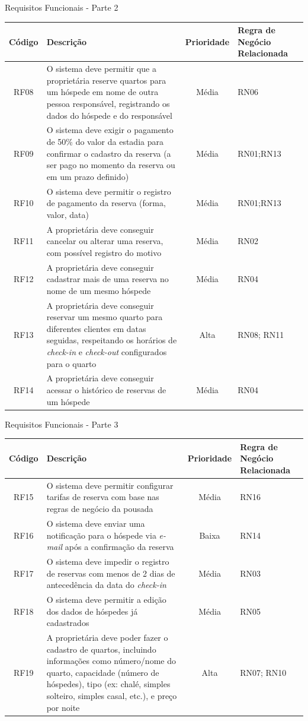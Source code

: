 \documentclass[
	12pt,				%
	openany,			%
	twoside,			%
	a4paper,			%
	english,			%
	french,				%
	spanish,			%
	brazil				%
	]{abntex2}
\begin{document}
\begin{quadro}[H]
	\caption{Requisitos Funcionais - Parte 2}
	\label{quadro_rf2}
	\begin{tabular}{|c|p{5cm}|c|p{4cm}|}
		\hline
		\textbf{Código} & \textbf{Descrição} & \textbf{Prioridade} & \textbf{Regra de Negócio Relacionada} \\ \hline
		RF08 & O sistema deve permitir que a proprietária reserve quartos para um hóspede em nome de outra pessoa responsável, registrando os dados do hóspede e do responsável & Média & RN06 \\ \hline
		RF09 & O sistema deve exigir o pagamento de 50\% do valor da estadia para confirmar o cadastro da reserva (a ser pago no momento da reserva ou em um prazo definido) & Média & RN01;RN13 \\ \hline
		RF10 & O sistema deve permitir o registro de pagamento da reserva (forma, valor, data) & Média & RN01;RN13 \\ \hline
		RF11 & A proprietária deve conseguir cancelar ou alterar uma reserva, com possível registro do motivo & Média & RN02 \\ \hline
		RF12 & A proprietária deve conseguir cadastrar mais de uma reserva no nome de um mesmo hóspede & Média & RN04 \\ \hline
		RF13 & A proprietária deve conseguir reservar um mesmo quarto para diferentes clientes em datas seguidas, respeitando os horários de \textit{check-in} e \textit{check-out} configurados para o quarto & Alta & RN08; RN11\\ \hline
		RF14 & A proprietária deve conseguir acessar o histórico de reservas de um hóspede & Média & RN04 \\ \hline
	\end{tabular}
\end{quadro}
\begin{quadro}[H]
	\caption{Requisitos Funcionais - Parte 3}
	\label{quadro_rf3}
	\begin{tabular}{|c|p{5cm}|c|p{4cm}|}
		\hline
		\textbf{Código} & \textbf{Descrição} & \textbf{Prioridade} & \textbf{Regra de Negócio Relacionada} \\ \hline
		RF15 & O sistema deve permitir configurar tarifas de reserva com base nas regras de negócio da pousada & Média & RN16 \\ \hline
		RF16 & O sistema deve enviar uma notificação para o hóspede via \textit{e-mail} após a confirmação da reserva & Baixa & RN14 \\ \hline
		RF17 & O sistema deve impedir o registro de reservas com menos de 2 dias de antecedência da data do \textit{check-in} & Média & RN03 \\ \hline
		RF18 & O sistema deve permitir  a edição dos dados de hóspedes já cadastrados & Média & RN05 \\ \hline
		RF19 & A proprietária deve poder fazer o cadastro de quartos, incluindo informações como número/nome do quarto, capacidade (número de hóspedes), tipo (ex: chalé, simples solteiro, simples casal, etc.), e preço por noite & Alta & RN07; RN10
		 \\ \hline
	\end{tabular}
\end{quadro}
\end{document}
